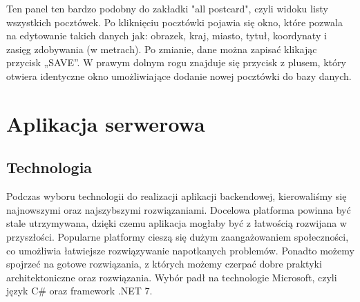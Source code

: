 \documentclass[a4paper,twoside,12pt]{book}
\begin{document}
Ten panel ten bardzo podobny do zakładki "all postcard", czyli widoku listy wszystkich pocztówek. Po kliknięciu pocztówki pojawia się okno, które pozwala na edytowanie takich danych jak: obrazek, kraj, miasto, tytuł, koordynaty i zasięg zdobywania (w metrach). Po zmianie, dane można zapisać klikając przycisk „SAVE”. W prawym dolnym rogu znajduje się przycisk z plusem, który otwiera identyczne okno umożliwiające dodanie nowej pocztówki do bazy danych.








\chapter{Aplikacja serwerowa}
\section{Technologia}
Podczas wyboru technologii do realizacji aplikacji backendowej, kierowaliśmy się najnowszymi oraz najszybszymi rozwiązaniami. Docelowa platforma powinna być stale utrzymywana, dzięki czemu aplikacja mogłaby być z łatwością rozwijana w przyszłości. Popularne platformy cieszą się dużym zaangażowaniem społeczności, co umożliwia łatwiejsze rozwiązywanie napotkanych problemów. Ponadto możemy spojrzeć na gotowe rozwiązania, z których możemy czerpać dobre praktyki architektoniczne oraz rozwiązania. Wybór padł na technologie Microsoft, czyli język C\# oraz framework .NET 7.  
\end{document}

